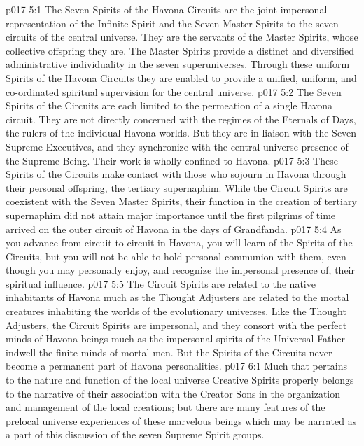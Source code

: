 \vs p017 5:1 The Seven Spirits of the Havona Circuits are the joint impersonal representation of the Infinite Spirit and the Seven Master Spirits to the seven circuits of the central universe. They are the servants of the Master Spirits, whose collective offspring they are. The Master Spirits provide a distinct and diversified administrative individuality in the seven superuniverses. Through these uniform Spirits of the Havona Circuits they are enabled to provide a unified, uniform, and co\hyp{}ordinated spiritual supervision for the central universe.
\vs p017 5:2 The Seven Spirits of the Circuits are each limited to the permeation of a single Havona circuit. They are not directly concerned with the regimes of the Eternals of Days, the rulers of the individual Havona worlds. But they are in liaison with the Seven Supreme Executives, and they synchronize with the central universe presence of the Supreme Being. Their work is wholly confined to Havona.\plusone
\vs p017 5:3 These Spirits of the Circuits make contact with those who sojourn in Havona through their personal offspring, the tertiary supernaphim. While the Circuit Spirits are coexistent with the Seven Master Spirits, their function in the creation of tertiary supernaphim did not attain major importance until the first pilgrims of time arrived on the outer circuit of Havona in the days of Grandfanda.
\vs p017 5:4 As you advance from circuit to circuit in Havona, you will learn of the Spirits of the Circuits, but you will not be able to hold personal communion with them, even though you may personally enjoy, and recognize the impersonal presence of, their spiritual influence.
\vs p017 5:5 The Circuit Spirits are related to the native inhabitants of Havona much as the Thought Adjusters are related to the mortal creatures inhabiting the worlds of the evolutionary universes. Like the Thought Adjusters, the Circuit Spirits are impersonal, and they consort with the perfect minds of Havona beings much as the impersonal spirits of the Universal Father indwell the finite minds of mortal men. But the Spirits of the Circuits never become a permanent part of Havona personalities.
\vs p017 6:1 Much that pertains to the nature and function of the local universe Creative Spirits properly belongs to the narrative of their association with the Creator Sons in the organization and management of the local creations; but there are many features of the prelocal universe experiences of these marvelous beings which may be narrated as a part of this discussion of the seven Supreme Spirit groups.
